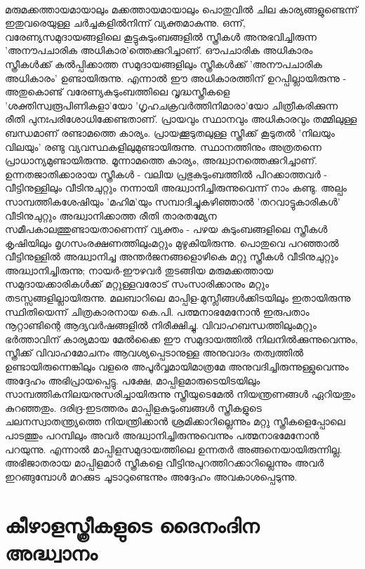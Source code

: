 \paragraph{}മരുമക്കത്തായമായാലും മക്കത്തായമായാലും പൊതുവിൽ ചില കാര്യങ്ങളുണ്ടെന്ന് ഇതുവരെയുള്ള ചർച്ചകളിൽനിന്ന് വ്യക്തമാകുന്നു. ഒന്ന്, വരേണ്യസമുദായങ്ങളിലെ കൂട്ടുകുടുംബങ്ങളിൽ സ്ത്രീകൾ അനുഭവിച്ചിരുന്ന 'അനൗപചാരിക അധികാര'ത്തെക്കുറിച്ചാണ്. ഔപചാരിക അധികാരം സ്ത്രീകൾക്ക് കൽപ്പിക്കാത്ത സമുദായങ്ങളിലും സ്ത്രീകൾക്ക് 'അനൗപചാരിക അധികാരം' ഉണ്ടായിരുന്നു. എന്നാൽ ഈ അധികാരത്തിന് ഉറപ്പില്ലായിരുന്നു - അതുകൊണ്ട് വരേണ്യകുടുംബത്തിലെ വൃദ്ധസ്ത്രീകളെ 'ശക്തിസ്വരൂപിണികളാ'യോ 'ഗൃഹചക്രവർത്തിനിമാരാ'യോ ചിത്രീകരിക്കുന്ന രീതി പുനഃപരിശോധിക്കേണ്ടതാണ്. പ്രായവും സ്ഥാനവും അധികാരവും തമ്മിലുള്ള ബന്ധമാണ് രണ്ടാമത്തെ കാര്യം. പ്രായക്കൂടുതലുള്ള സ്ത്രീക്ക് കൂടുതൽ 'നിലയും വിലയും' രണ്ടു വ്യവസ്ഥകളിലുമുണ്ടായിരുന്നു. സ്ഥാനത്തിനും അത്രതന്നെ പ്രാധാന്യമുണ്ടായിരുന്നു. മൂന്നാമത്തെ കാര്യം, അദ്ധ്വാനത്തെക്കുറിച്ചാണ്. ഉന്നതജാതിക്കാരായ സ്ത്രീകൾ - വലിയ പ്രഭുകുടുംബത്തിൽ പിറക്കാത്തവർ - വീട്ടിനുള്ളിലും വീടിനുചുറ്റും നന്നായി അദ്ധ്വാനിച്ചിരുന്നുവെന്ന് നാം കണ്ടു. അല്പം സാമ്പത്തികശേഷിയും 'മഹിമ'യും സമ്പാദിച്ചുകഴിഞ്ഞാൽ 'തറവാട്ടുകാരികൾ' വീടിനുചുറ്റും അദ്ധ്വാനിക്കാത്ത രീതി താരതമ്യേന സമീപകാലത്തുണ്ടായതാണെന്ന് വ്യക്തം - പഴയ കുടുംബങ്ങളിലെ സ്ത്രീകൾ കൃഷിയിലും മൃഗസംരക്ഷണത്തിലുംമറ്റും മുഴുകിയിരുന്നു. പൊതുവെ പറഞ്ഞാൽ വീട്ടിനുള്ളിൽ അദ്ധ്വാനിച്ച അന്തർജനങ്ങളൊഴികെ മറ്റു സ്ത്രീകൾ വീടിനുചുറ്റും അദ്ധ്വാനിച്ചിരുന്നു; നായർ-ഈഴവർ തുടങ്ങിയ മരുമക്കത്തായ സമുദായക്കാരികൾക്ക് മറ്റുള്ളവരോട് സംസാരിക്കാനും മറ്റും തടസ്സങ്ങളില്ലായിരുന്നു. മലബാറിലെ മാപ്പിള-മുസ്ലീങ്ങൾക്കിടയിലും ഇതായിരുന്നു സ്ഥിതിയെന്ന് ചിത്രകാരനായ കെ.പി. പത്മനാഭമേനോൻ ഇരുപതാം നൂറ്റാണ്ടിന്റെ ആദ്യവർഷങ്ങളിൽ നിരീക്ഷിച്ചു. വിവാഹബന്ധത്തിലുംമറ്റും ഭർത്താവിന് കാര്യമായ മേൽക്കൈ ഈ സമുദായത്തിൽ നിലനിൽക്കുന്നുവെന്നും, സ്ത്രീക്ക് വിവാഹമോചനം ആവശ്യപ്പെടാനുള്ള അനുവാദം തത്വത്തിൽ ഉണ്ടായിരുന്നെങ്കിലും വളരെ അപൂർവ്വമായിമാത്രമേ അനുവദിച്ചിരുന്നുള്ളുവെന്നും അദ്ദേഹം അഭിപ്രായപ്പെട്ടു. പക്ഷേ, മാപ്പിളമാരുടെയിടയിലും സാമ്പത്തികനിലയനുസരിച്ചായിരുന്നു സ്ത്രീയുടെമേൽ നിയന്ത്രണങ്ങൾ ഏറിയതും കുറഞ്ഞതും. ദരിദ്ര-ഇടത്തരം മാപ്പിളകുടുംബങ്ങൾ സ്ത്രീകളുടെ ചലനസ്വാതന്ത്ര്യത്തെ നിയന്ത്രിക്കാൻ ശ്രമിക്കാറില്ലെന്നും മറ്റു സ്ത്രീകളെപ്പോലെ പാടത്തും പറമ്പിലും അവർ അദ്ധ്വാനിച്ചിരുന്നുവെന്നും പത്മനാഭമേനോൻ പറയുന്നു. എന്നാൽ മാപ്പിളസമുദായത്തിലെ ഉന്നതർ അങ്ങനെയായിരുന്നില്ല. അഭിജാതരായ മാപ്പിളമാർ സ്ത്രീകളെ വീട്ടിനുപുറത്തിറക്കാറില്ലെന്നും അവർ ഇറങ്ങുമ്പോൾ മറക്കുട ചൂടാറുണ്ടെന്നും അദ്ദേഹം അവകാശപ്പെടുന്നു.

\section{കീഴാളസ്ത്രീകളുടെ ദൈനംദിന അദ്ധ്വാനം}
